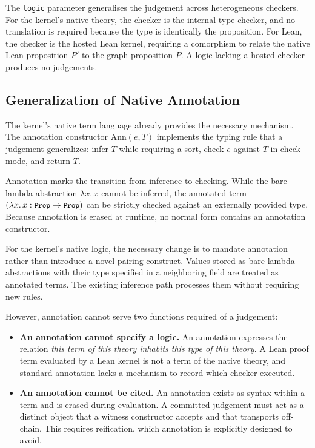 \documentclass[manuscript,nonacm=true]{acmart}
\newcommand{\code}[1]{\texttt{\small #1}}
\newcommand{\Prop}{\code{Prop}}
\begin{document}
The \code{logic} parameter generalises the judgement across heterogeneous checkers. For the kernel's native theory, the checker is the internal type checker, and no translation is required because the type is identically the proposition. For Lean, the checker is the hosted Lean kernel, requiring a comorphism to relate the native Lean proposition $P'$ to the graph proposition $P$. A logic lacking a hosted checker produces no judgements.

\subsection{Generalization of Native Annotation}

The kernel's native term language already provides the necessary mechanism. The annotation constructor $\mathrm{Ann}(e, T)$ implements the typing rule that a judgement generalizes: infer $T$ while requiring a sort, check $e$ against $T$ in check mode, and return $T$.

Annotation marks the transition from inference to checking. While the bare lambda abstraction $\lambda x.\,x$ cannot be inferred, the annotated term $(\lambda x.\,x : \Prop \rightarrow \Prop)$ can be strictly checked against an externally provided type. Because annotation is erased at runtime, no normal form contains an annotation constructor.

For the kernel's native logic, the necessary change is to mandate annotation rather than introduce a novel pairing construct. Values stored as bare lambda abstractions with their type specified in a neighboring field are treated as annotated terms. The existing inference path processes them without requiring new rules.

However, annotation cannot serve two functions required of a judgement:

\begin{itemize}
\item \textbf{An annotation cannot specify a logic.} An annotation expresses the relation \emph{this term of this theory inhabits this type of this theory}. A Lean proof term evaluated by a Lean kernel is not a term of the native theory, and standard annotation lacks a mechanism to record which checker executed.
\item \textbf{An annotation cannot be cited.} An annotation exists as syntax within a term and is erased during evaluation. A committed judgement must act as a distinct object that a witness constructor accepts and that transports off-chain. This requires reification, which annotation is explicitly designed to avoid.
\end{itemize}
\end{document}
